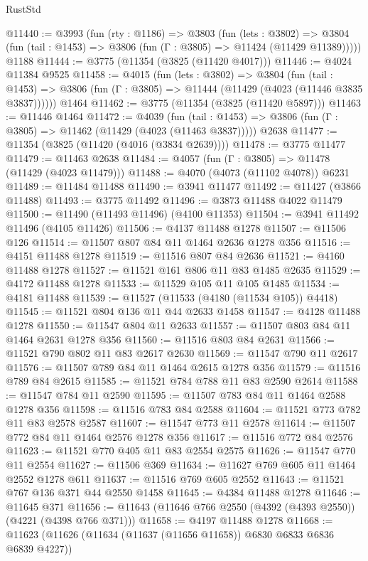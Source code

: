 \begin{lexlean}{RustStd}
\begin{coremodule}
@11440 := @3993
    (fun (rty : @1186) =>
    @3803
      (fun (lets : @3802) =>
      @3804 (fun (tail : @1453) => @3806 (fun (Γ : @3805) => @11424 (@11429 @11389)))))
    @1188
@11444 := @3775 (@11354 (@3825 (@11420 @4017)))
@11446 := @4024 @11384 @9525
@11458 := @4015
    (fun (lets : @3802) =>
    @3804
      (fun (tail : @1453) =>
      @3806 (fun (Γ : @3805) => @11444 (@11429 (@4023 (@11446 @3835 @3837))))))
    @1464
@11462 := @3775 (@11354 (@3825 (@11420 @5897)))
@11463 := @11446 @1464
@11472 := @4039
    (fun (tail : @1453) => @3806 (fun (Γ : @3805) => @11462 (@11429 (@4023 (@11463 @3837)))))
    @2638
@11477 := @11354 (@3825 (@11420 (@4016 (@3834 @2639))))
@11478 := @3775 @11477
@11479 := @11463 @2638
@11484 := @4057 (fun (Γ : @3805) => @11478 (@11429 (@4023 @11479)))
@11488 := @4070 (@4073 (@11102 @4078)) @6231
@11489 := @11484 @11488
@11490 := @3941 @11477
@11492 := @11427 (@3866 @11488)
@11493 := @3775 @11492
@11496 := @3873 @11488 @4022 @11479
@11500 := @11490 (@11493 @11496) (@4100 @11353)
@11504 := @3941 @11492 @11496 (@4105 @11426)
@11506 := @4137 @11488 @1278
@11507 := @11506 @126
@11514 := @11507 @807 @84 @11 @1464 @2636 @1278 @356
@11516 := @4151 @11488 @1278
@11519 := @11516 @807 @84 @2636
@11521 := @4160 @11488 @1278
@11527 := @11521 @161 @806 @11 @83 @1485 @2635
@11529 := @4172 @11488 @1278
@11533 := @11529 @105 @11 @105 @1485
@11534 := @4181 @11488
@11539 := @11527 (@11533 (@4180 (@11534 @105)) @4418)
@11545 := @11521 @804 @136 @11 @44 @2633 @1458
@11547 := @4128 @11488 @1278
@11550 := @11547 @804 @11 @2633
@11557 := @11507 @803 @84 @11 @1464 @2631 @1278 @356
@11560 := @11516 @803 @84 @2631
@11566 := @11521 @790 @802 @11 @83 @2617 @2630
@11569 := @11547 @790 @11 @2617
@11576 := @11507 @789 @84 @11 @1464 @2615 @1278 @356
@11579 := @11516 @789 @84 @2615
@11585 := @11521 @784 @788 @11 @83 @2590 @2614
@11588 := @11547 @784 @11 @2590
@11595 := @11507 @783 @84 @11 @1464 @2588 @1278 @356
@11598 := @11516 @783 @84 @2588
@11604 := @11521 @773 @782 @11 @83 @2578 @2587
@11607 := @11547 @773 @11 @2578
@11614 := @11507 @772 @84 @11 @1464 @2576 @1278 @356
@11617 := @11516 @772 @84 @2576
@11623 := @11521 @770 @405 @11 @83 @2554 @2575
@11626 := @11547 @770 @11 @2554
@11627 := @11506 @369
@11634 := @11627 @769 @605 @11 @1464 @2552 @1278 @611
@11637 := @11516 @769 @605 @2552
@11643 := @11521 @767 @136 @371 @44 @2550 @1458
@11645 := @4384 @11488 @1278
@11646 := @11645 @371
@11656 := @11643 (@11646 @766 @2550 (@4392 (@4393 @2550)) (@4221 (@4398 @766 @371)))
@11658 := @4197 @11488 @1278
@11668 := @11623 (@11626 (@11634 (@11637 (@11656 @11658)) @6830 @6833 @6836 @6839 @4227))

\end{coremodule}
\end{lexlean}
